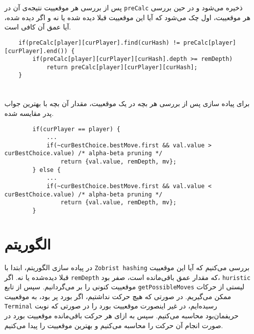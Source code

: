 پس از بررسی هر موقعییت نتیجه‌ی آن در
\verb;preCalc;
ذخیره می‌شود و در حین بررسی هر موقعییت، اول چک می‌شود که آیا این موقعییت قبلا دیده شده یا نه و اگر دیده شده، آیا عمق آن کافی است.

\begin{latin}
\begin{lstlisting}
	if(preCalc[player][curPlayer].find(curHash) != preCalc[player][curPlayer].end()) {
		if(preCalc[player][curPlayer][curHash].depth >= remDepth)
			return preCalc[player][curPlayer][curHash];
	}
\end{lstlisting}
\end{latin}

\section{}
برای پیاده سازی
پس از بررسی هر بچه در یک موقعییت، مقدار آن بچه با بهترین جواب پدر مقایسه شده.

\begin{latin}
\begin{lstlisting}
		if(curPlayer == player) {
			...
			if(~curBestChoice.bestMove.first && val.value > curBestChoice.value) /* alpha-beta pruning */
				return {val.value, remDepth, mv};
		} else {
			...
			if(~curBestChoice.bestMove.first && val.value < curBestChoice.value) /* alpha-beta pruning */
				return {val.value, remDepth, mv};
		}

\end{lstlisting}
\end{latin}

\section{الگوریتم}
در پیاده سازی الگوریتم، ابتدا با
\verb;Zobrist hashing;
 بررسی می‌کنیم که آیا این  موقعییت قبلا دیده‌شده یا نه.
 اگر
 \verb;remDepth;
 که مقدار عمق باقی‌مانده است، صفر بود، 
 \verb;huristic;
 موقعییت کنونی را بر می‌گردانیم.
 سپس از تابع 
 \verb;getPossibleMoves;
 لیستی از حرکات ممکن می‌گیریم.
 در صورتی که هیچ حرکت نداشتیم، اگر بورد پر بود، به  موقعییت
 \verb;Terminal;
 رسیده‌ایم، در غیر اینصورت موقعییت بورد را در صورتی که نوبت حریفمان‌بود محاسبه می‌کنیم.
 سپس به ازای هر حرکت باقی‌مانده موقعییت بورد در صورت انجام آن حرکت را محاسبه می‌کنیم و بهترین موقعییت را پیدا می‌کنیم.
 
